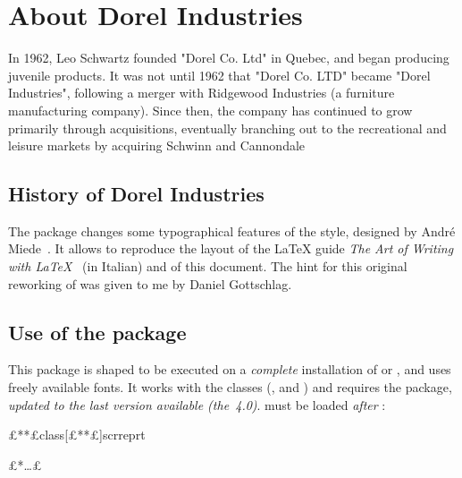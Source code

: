 \chapter{About Dorel Industries}
\label{chp:about}

In 1962, Leo Schwartz founded "Dorel Co. Ltd" in Quebec, and began producing juvenile products.  It was not until 1962 that "Dorel Co. LTD" became "Dorel Industries", following a merger with Ridgewood Industries (a furniture manufacturing company).  Since then, the company has continued to grow primarily through acquisitions, eventually branching out to the recreational and leisure markets by acquiring Schwinn and Cannondale


\section{History of Dorel Industries}


The \arsclassica{} package changes some typographical features of the \classicthesis{} style, designed by Andr\'e Miede~\citep{miede:classicthesis,pantieri:classicthesis}. It allows to reproduce the layout of the \LaTeX{} guide \emph{The Art of Writing with \LaTeX}~\citep{pantieri:art} (in Italian) and of this document. The hint for this original reworking of \classicthesis{} was given to me by Daniel Gottschlag.



\section{Use of the package}

This package is shaped to be executed on a \emph{complete} installation of \miktex{} or \texlive, and uses freely available fonts.
It works with the  classes (,  and ) and requires the  package, \emph{updated to the last version available (the~4.0)}. \arsclassica{} must be loaded \emph{after} :
\begin{code}
\document£**£class[£*\meta{\dots\unkern}*£]{scrreprt} %

\usepackage[£*\meta{\dots\unkern}*£]{classicthesis}
\usepackage{arsclassica}


£*\dots*£

\end{code}

